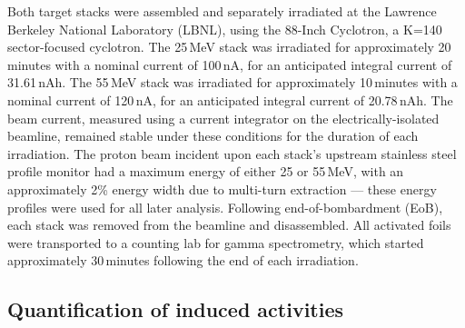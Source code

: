 Both target stacks were assembled and separately irradiated at the  Lawrence Berkeley National Laboratory  (LBNL), using the 88-Inch Cyclotron, a  K=140 sector-focused cyclotron.
The 25\,MeV stack was irradiated for approximately 20\,minutes with a nominal current of 100\,nA,  for an anticipated integral current of 31.61\,nAh. 
The 55\,MeV stack was irradiated for approximately 10\,minutes with a nominal current of 120\,nA,  for an anticipated integral current of 20.78\,nAh. 
The beam current, measured using a current integrator on the electrically-isolated beamline, remained stable under these conditions for the duration of each irradiation.
The proton beam incident upon each stack's upstream stainless steel profile monitor had a maximum energy of either 25 or 55\,MeV, with an approximately 2\% energy width due to multi-turn extraction --- these energy profiles were used for all later analysis.
Following end-of-bombardment (EoB), each stack was removed from the beamline and disassembled.
All activated foils were transported to a counting lab for gamma spectrometry, which started approximately 30\,minutes following the end of each irradiation.





\subsection{\label{sec:spectroscopy_fe}Quantification of induced activities}


